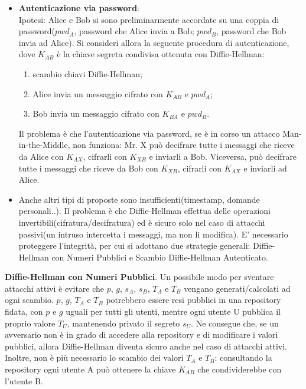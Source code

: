 \begin{itemize}
\item \textbf{Autenticazione via password}: \\ Ipotesi: Alice e Bob si sono preliminarmente accordate su una coppia di password($pwd_{A}$, password che Alice invia a Bob; $pwd_{B}$, password che Bob invia ad Alice). Si consideri allora la seguente procedura di autenticazione, dove $K_{AB}$ è la chiave segreta condivisa ottenuta con Diffie-Hellman: \begin{enumerate}
\item scambio chiavi Diffie-Hellman;
\item Alice invia un messaggio cifrato con $K_{AB}$ e $pwd_{A}$;
\item Bob invia un messaggio cifrato con $K_{BA}$ e $pwd_{B}$.
\end{enumerate}
Il problema è che l'autenticazione via password, se è in corso un attacco Man-in-the-Middle, non funziona: Mr. X può decifrare tutte i messaggi che riceve da Alice con $K_{AX}$, cifrarli con $K_{XB}$ e inviarli a Bob. Viceversa, può decifrare tutte i messaggi che riceve da Bob con $K_{XB}$, cifrarli con $K_{AX}$ e inviarli ad Alice.
\item Anche altri tipi di proposte sono insufficienti(timestamp, domande personali..). Il problema è che Diffie-Hellman effettua delle operazioni invertibili(cifratura/decifratura) ed è sicuro solo nel caso di attacchi passivi(un intruso intercetta i messaggi, ma non li modifica). E' necessario proteggere l'integrità, per cui si adottano due strategie generali: Diffie-Hellman con Numeri Pubblici e Scambio Diffie-Hellman Autenticato.	
\end{itemize}

\textbf{Diffie-Hellman con Numeri Pubblici}. Un possibile modo per sventare attacchi attivi è evitare che $p$, $g$, $s_{A}$, $s_{B}$, $T_{A}$ e $T_{B}$ vengano generati/calcolati ad ogni scambio. $p$, $g$, $T_{A}$ e $T_{B}$ potrebbero essere resi pubblici in una repository fidata, con $p$ e $g$ uguali per tutti gli utenti, mentre ogni utente U pubblica il proprio valore $T_{U}$, mantenendo privato il segreto $s_{U}$. Ne consegue che, se un avversario non è in grado di accedere alla repository e di modificare i valori pubblici, allora Diffie-Hellman diventa sicuro anche nel caso di attacchi attivi. Inoltre, non è più necessario lo scambio dei valori $T_{A}$ e $T_{B}$: consultando la repository ogni utente A può ottenere la chiave $K_{AB}$ che condividerebbe con l'utente B. \\

